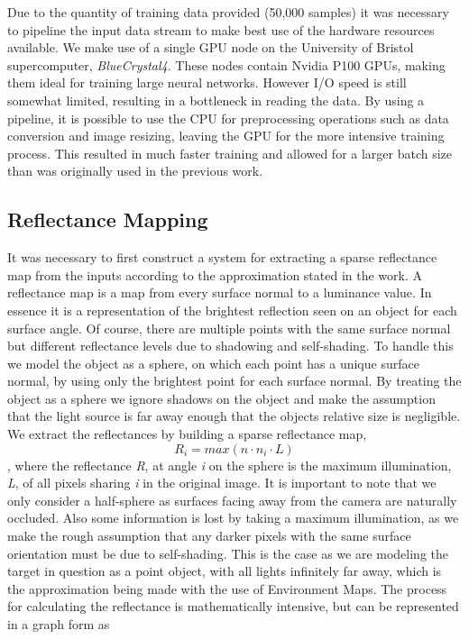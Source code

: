 \documentclass[ %
                    author={Gavin Parker},
                supervisor={Dr. Neill Campbell},
                    degree={MEng},
                     title={Deep Siamese Networks for Illumination Estimation from Stereo Images},
                  subtitle={},
                      type={Research},
                      year={2018} ]{dissertation}
\begin{document}
Due to the quantity of training data provided (50,000 samples) it was necessary to pipeline the input data stream to make best use of the hardware resources available. We make use of a single GPU node on the University of Bristol supercomputer, \textit{BlueCrystal4}. These nodes contain Nvidia P100 GPUs, making them ideal for training large neural networks. However I/O speed is still somewhat limited, resulting in a bottleneck in reading the data. By using a pipeline, it is possible to use the CPU for preprocessing operations such as data conversion and image resizing, leaving the GPU for the more intensive training process. This resulted in much faster training and allowed for a larger batch size than was originally used in the previous work.
\subsection{Reflectance Mapping}
It was necessary to first construct a system for extracting a sparse reflectance map from the inputs according to the approximation stated in the work. A reflectance map is a map from every surface normal to a luminance value. In essence it is a representation of the brightest reflection seen on an object for each surface angle. Of course, there are multiple points with the same surface normal but different reflectance levels due to shadowing and self-shading. To handle this we model the object as a sphere, on which each point has a unique surface normal, by using only the brightest point for each surface normal. By treating the object as a sphere we ignore shadows on the object and make the assumption that the light source is far away enough that the objects relative size is negligible. We extract the reflectances by building a sparse reflectance map,
\[ R_i = max(n\cdot n_i \cdot L)\],
where the reflectance \textit{R}, at angle \textit{i} on the sphere is the maximum illumination, \textit{L}, of all pixels sharing \textit{i} in the original image. It is important to note that we only consider a half-sphere as surfaces facing away from the camera are naturally occluded. Also some information is lost by taking a maximum illumination, as we make the rough assumption that any darker pixels with the same surface orientation must be due to self-shading. This is the case as we are modeling the target in question as a point object, with all lights infinitely far away, which is the approximation being made with the use of Environment Maps.
\newline
The process for calculating the reflectance is mathematically intensive, but can be represented in a graph form as
\end{document}
